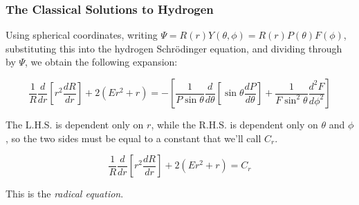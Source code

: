 \documentclass{beamer}
\begin{document}
\begin{frame}
\frametitle{The Classical Solutions to Hydrogen}
Using spherical coordinates, writing $\Psi=R(r)Y(\theta, \phi) = R(r)P(\theta)F(\phi)$,
substituting this into the hydrogen Schr\"odinger equation, and dividing through by $\Psi$,
we obtain the following expansion:


\begin{equation*}
\frac{1}{R} \frac{d}{dr}\left[ r^2 \frac{dR}{dr}\right] + 2(Er^2 + r)
= - \left[\frac{1}{P\sin\theta} \frac{d}{d\theta}\left[\sin\theta\frac{dP}{d\theta}\right]+\frac{1}{F\sin^2\theta}\frac{d^2 F}{d\phi^2}\right]
\end{equation*}

The L.H.S. is dependent only on $r$, while the R.H.S. is dependent only on $\theta$ and $\phi$, so the
two sides must be equal to a constant that we'll call $C_r$.

\begin{equation*}
\frac{1}{R} \frac{d}{dr}\left[ r^2 \frac{dR}{dr}\right] + 2(Er^2 + r) = C_r
\end{equation*}

This is the {\it radical equation}.


\end{frame}
\end{document}
